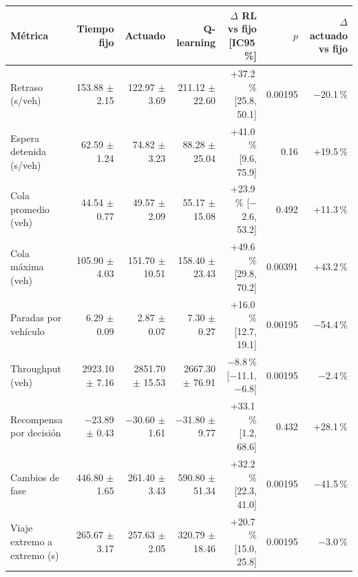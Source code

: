 \begin{table}[H]
\centering
\scriptsize
\setlength{\tabcolsep}{3pt}
\setlength{\tabcolsep}{2pt}
\begin{tabular}{lrrrrrr}
\toprule
Métrica & Tiempo fijo & Actuado & Q-learning & \makecell{$\Delta$ RL vs fijo\\{}[IC95\,\%]} & $p$ & \makecell{$\Delta$ actuado\\vs fijo} \\
\midrule
Retraso (s/veh) & 153.88 $\pm$ 2.15 & 122.97 $\pm$ 3.69 & 211.12 $\pm$ 22.60 & \makecell{+37.2\,\%\\{}[25.8, 50.1]} & 0.00195 & $-$20.1\,\% \\
Espera detenida (s/veh) & 62.59 $\pm$ 1.24 & 74.82 $\pm$ 3.23 & 88.28 $\pm$ 25.04 & \makecell{+41.0\,\%\\{}[9.6, 75.9]} & 0.16 & +19.5\,\% \\
Cola promedio (veh) & 44.54 $\pm$ 0.77 & 49.57 $\pm$ 2.09 & 55.17 $\pm$ 15.08 & \makecell{+23.9\,\%\\{}[$-$2.6, 53.2]} & 0.492 & +11.3\,\% \\
Cola máxima (veh) & 105.90 $\pm$ 4.03 & 151.70 $\pm$ 10.51 & 158.40 $\pm$ 23.43 & \makecell{+49.6\,\%\\{}[29.8, 70.2]} & 0.00391 & +43.2\,\% \\
Paradas por vehículo & 6.29 $\pm$ 0.09 & 2.87 $\pm$ 0.07 & 7.30 $\pm$ 0.27 & \makecell{+16.0\,\%\\{}[12.7, 19.1]} & 0.00195 & $-$54.4\,\% \\
Throughput (veh) & 2923.10 $\pm$ 7.16 & 2851.70 $\pm$ 15.53 & 2667.30 $\pm$ 76.91 & \makecell{$-$8.8\,\%\\{}[$-$11.1, $-$6.8]} & 0.00195 & $-$2.4\,\% \\
Recompensa por decisión & $-$23.89 $\pm$ 0.43 & $-$30.60 $\pm$ 1.61 & $-$31.80 $\pm$ 9.77 & \makecell{+33.1\,\%\\{}[1.2, 68.6]} & 0.432 & +28.1\,\% \\
Cambios de fase & 446.80 $\pm$ 1.65 & 261.40 $\pm$ 3.43 & 590.80 $\pm$ 51.34 & \makecell{+32.2\,\%\\{}[22.3, 41.0]} & 0.00195 & $-$41.5\,\% \\
Viaje extremo a extremo (s) & 265.67 $\pm$ 3.17 & 257.63 $\pm$ 2.05 & 320.79 $\pm$ 18.46 & \makecell{+20.7\,\%\\{}[15.0, 25.8]} & 0.00195 & $-$3.0\,\% \\

\end{tabular}
\end{table}
